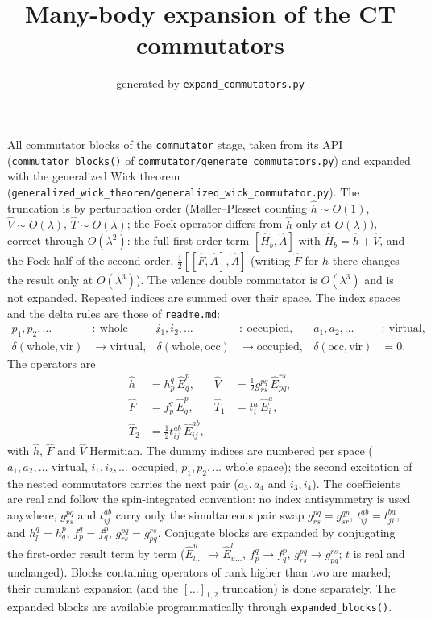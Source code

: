 \documentclass[11pt]{article}
\title{Many-body expansion of the CT commutators}
\date{generated by \texttt{expand\_commutators.py}}
\begin{document}
\maketitle

All commutator blocks of the \texttt{commutator} stage, taken from its API (\texttt{commutator\_blocks()} of \texttt{commutator/generate\_commutators.py}) and expanded with the generalized Wick theorem (\texttt{generalized\_wick\_theorem/generalized\_wick\_commutator.py}). The truncation is by perturbation order (M\o ller--Plesset counting $\hat{h} \sim O(1)$, $\hat{V} \sim O(\lambda)$, $\hat{T} \sim O(\lambda)$; the Fock operator differs from $\hat{h}$ only at $O(\lambda)$), correct through $O(\lambda^2)$: the full first-order term $[\hat{H}_b, \hat{A}]$ with $\hat{H}_b = \hat{h} + \hat{V}$, and the Fock half of the second order, $\tfrac{1}{2}[[\hat{F}, \hat{A}], \hat{A}]$ (writing $\hat{F}$ for $\hat{h}$ there changes the result only at $O(\lambda^3)$).  The valence double commutator is $O(\lambda^3)$ and is not expanded. Repeated indices are summed over their space.  The index spaces and the delta rules are those of \texttt{readme.md}:
\begin{align}
p_1,p_2,\ldots &:\ \text{whole space}, &
i_1,i_2,\ldots &:\ \text{occupied}, &
a_1,a_2,\ldots &:\ \text{virtual}, \\
\delta(\text{whole},\text{vir}) &\to \text{virtual}, &
\delta(\text{whole},\text{occ}) &\to \text{occupied}, &
\delta(\text{occ},\text{vir}) &= 0.
\end{align}
The operators are
\begin{align}
\hat{h} &= h^q_p\, \hat{E}^p_q, &
\hat{V} &= \tfrac{1}{2} g^{pq}_{rs}\, \hat{E}^{rs}_{pq}, \\
\hat{F} &= f^q_p\, \hat{E}^p_q, &
\hat{T}_1 &= t^a_i\, \hat{E}^a_i, \\
\hat{T}_2 &= \tfrac{1}{2} t^{ab}_{ij}\, \hat{E}^{ab}_{ij},
\end{align}
with $\hat{h}$, $\hat{F}$ and $\hat{V}$ Hermitian.  The dummy indices are numbered per space ($a_1,a_2,\ldots$ virtual, $i_1,i_2,\ldots$ occupied, $p_1,p_2,\ldots$ whole space); the second excitation of the nested commutators carries the next pair ($a_3,a_4$ and $i_3,i_4$). The coefficients are real and follow the spin-integrated convention: no index antisymmetry is used anywhere, $g^{pq}_{rs}$ and $t^{ab}_{ij}$ carry only the simultaneous pair swap $g^{pq}_{rs} = g^{qp}_{sr}$, $t^{ab}_{ij} = t^{ba}_{ji}$, and $h^q_p = h^p_q$, $f^q_p = f^p_q$, $g^{pq}_{rs} = g^{rs}_{pq}$. Conjugate blocks are expanded by conjugating the first-order result term by term ($\hat{E}^{u\ldots}_{l\ldots} \to \hat{E}^{l\ldots}_{u\ldots}$, $f^q_p \to f^p_q$, $g^{pq}_{rs} \to g^{rs}_{pq}$; $t$ is real and unchanged). Blocks containing operators of rank higher than two are marked; their cumulant expansion (and the $[\ldots]_{1,2}$ truncation) is done separately.  The expanded blocks are available programmatically through \texttt{expanded\_blocks()}.
\end{document}
